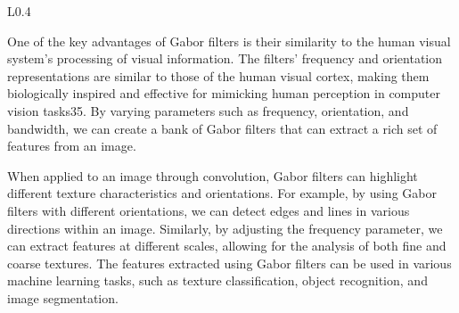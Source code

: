 \begin{wrapfigure}{L}{0.4\textwidth}
\begin{tcolorbox}[every float=\centering, drop shadow, title=The Gabor Kernel Function ,colback=white,colframe=WMgreen,
  colbacktitle=WMgreen,]
  \label{fig:gabor}
 \end{tcolorbox}
\end{wrapfigure}
\FloatBarrier

One of the key advantages of Gabor filters is their similarity to the human visual system's processing of visual information. The filters' frequency and orientation representations are similar to those of the human visual cortex, making them biologically inspired and effective for mimicking human perception in computer vision tasks35. By varying parameters such as frequency, orientation, and bandwidth, we can create a bank of Gabor filters that can extract a rich set of features from an image.

When applied to an image through convolution, Gabor filters can highlight different texture characteristics and orientations. For example, by using Gabor filters with different orientations, we can detect edges and lines in various directions within an image. Similarly, by adjusting the frequency parameter, we can extract features at different scales, allowing for the analysis of both fine and coarse textures. The features extracted using Gabor filters can be used in various machine learning tasks, such as texture classification, object recognition, and image segmentation. 

